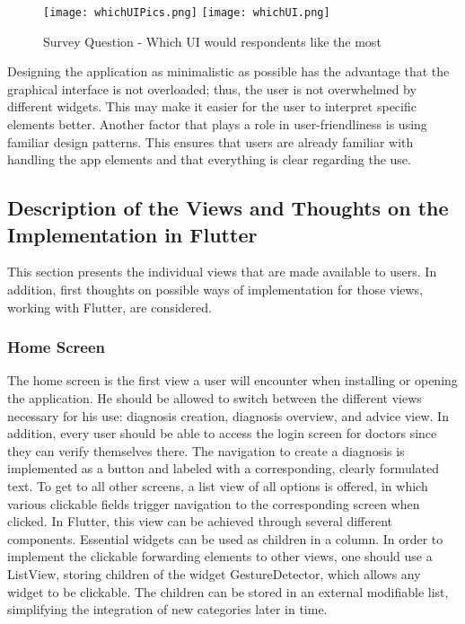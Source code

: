 \begin{figure}[H]
	\centering
	\texttt{[image: whichUIPics.png]}
	\texttt{[image: whichUI.png]}
	\caption[Survey Question]{Survey Question - Which UI would respondents like the most}
\end{figure}
\noindent
Designing the application as minimalistic as possible has the advantage that the graphical interface is not overloaded; thus, the user is not overwhelmed by different widgets. This may make it easier for the user to interpret specific elements better. Another factor that plays a role in user-friendliness is using familiar design patterns. This ensures that users are already familiar with handling the app elements and that everything is clear regarding the use. 

\subsection{Description of the Views and Thoughts on the Implementation in Flutter}
This section presents the individual views that are made available to users. In addition, first thoughts on possible ways of implementation for those views, working with Flutter, are considered.
\subsubsection{\textbf{Home Screen}}
The home screen is the first view a user will encounter when installing or opening the application. He should be allowed to switch between the different views necessary for his use: diagnosis creation, diagnosis overview, and advice view. In addition, every user should be able to access the login screen for doctors since they can verify themselves there. The navigation to create a diagnosis is implemented as a button and labeled with a corresponding, clearly formulated text. To get to all other screens, a list view of all options is offered, in which various clickable fields trigger navigation to the corresponding screen when clicked. In Flutter, this view can be achieved through several different components. Essential widgets can be used as children in a column. In order to implement the clickable forwarding elements to other views, one should use a ListView, storing children of the widget GestureDetector, which allows any widget to be clickable. The children can be stored in an external modifiable list, simplifying the integration of new categories later in time.

